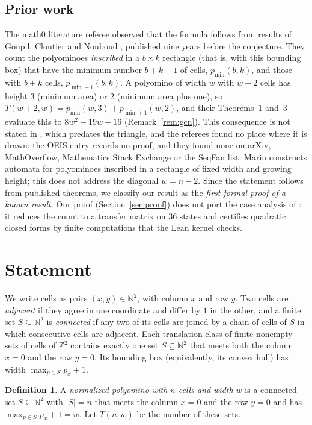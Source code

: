 \documentclass[11pt]{amsart}
\theoremstyle{plain}
\theoremstyle{definition}
\newtheorem{definition}[theorem]{Definition}
\newcommand{\N}{\mathbb{N}}
\newcommand{\Z}{\mathbb{Z}}
\begin{document}
\subsection*{Prior work}
The math0 literature referee observed that the formula follows from results of Goupil, Cloutier and Nouboud \cite{GCN}, published nine years before the conjecture. They count the polyominoes \emph{inscribed} in a $b\times k$ rectangle (that is, with this bounding box) that have the minimum number $b+k-1$ of cells, $p_{\min}(b,k)$, and those with $b+k$ cells, $p_{\min+1}(b,k)$. A polyomino of width $w$ with $w+2$ cells has height $3$ (minimum area) or $2$ (minimum area plus one), so $T(w+2,w)=p_{\min}(w,3)+p_{\min+1}(w,2)$, and their Theorems~1 and~3 evaluate this to $8w^2-19w+16$ (Remark~\ref{rem:gcn}). This consequence is not stated in \cite{GCN}, which predates the triangle, and the referees found no place where it is drawn: the OEIS entry records no proof, and they found none on arXiv, MathOverflow, Mathematics Stack Exchange or the SeqFan list. Marin \cite{Ma} constructs automata for polyominoes inscribed in a rectangle of fixed width and growing height; this does not address the diagonal $w=n-2$. Since the statement follows from published theorems, we classify our result as the \emph{first formal proof of a known result}. Our proof (Section~\ref{sec:proof}) does not port the case analysis of \cite{GCN}: it reduces the count to a transfer matrix on $36$ states and certifies quadratic closed forms by finite computations that the Lean kernel checks.

\section{Statement}\label{sec:statement}

We write cells as pairs $(x,y)\in\N^2$, with column $x$ and row $y$. Two cells are \emph{adjacent} if they agree in one coordinate and differ by $1$ in the other, and a finite set $S\subseteq\N^2$ is \emph{connected} if any two of its cells are joined by a chain of cells of $S$ in which consecutive cells are adjacent. Each translation class of finite nonempty sets of cells of $\Z^2$ contains exactly one set $S\subseteq\N^2$ that meets both the column $x=0$ and the row $y=0$. Its bounding box (equivalently, its convex hull) has width $\max_{p\in S}p_x+1$.

\begin{definition}\label{def:T}
A \emph{normalized polyomino with $n$ cells and width $w$} is a connected set $S\subseteq\N^2$ with $|S|=n$ that meets the column $x=0$ and the row $y=0$ and has $\max_{p\in S}p_x+1=w$. Let $T(n,w)$ be the number of these sets.
\end{definition}
\end{document}
